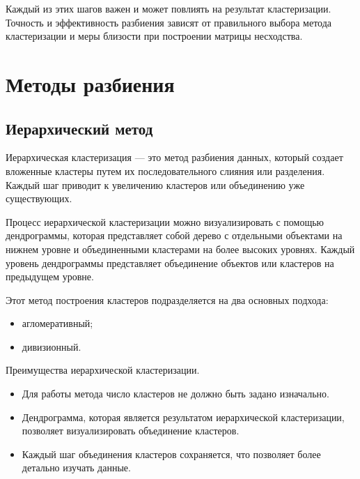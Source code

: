Каждый из этих шагов важен и может повлиять на результат кластеризации. Точность и эффективность разбиения зависят от правильного выбора метода кластеризации и меры близости при построении матрицы несходства.

\clearpage

\section{Методы разбиения}



\subsection{Иерархический метод}

Иерархическая кластеризация \cite{ClassicalMethods} --- это метод разбиения данных, который создает вложенные кластеры путем их последовательного слияния или разделения. Каждый шаг приводит к увеличению кластеров или объединению уже существующих.

Процесс иерархической кластеризации можно визуализировать с помощью дендрограммы, которая представляет собой дерево с отдельными объектами на нижнем уровне и объединенными кластерами на более высоких уровнях. Каждый уровень дендрограммы представляет объединение объектов или кластеров на предыдущем уровне.

Этот метод построения кластеров подразделяется на два основных подхода:

\begin{itemize}
    \item агломеративный;
    \item дивизионный.
\end{itemize}

Преимущества иерархической кластеризации.

\begin{itemize}
    \item Для работы метода число кластеров не должно быть задано изначально.
    \item Дендрограмма, которая является результатом иерархической кластеризации, позволяет визуализировать объединение кластеров.
    \item Каждый шаг объединения кластеров сохраняется, что позволяет более детально изучать данные.
\end{itemize}

